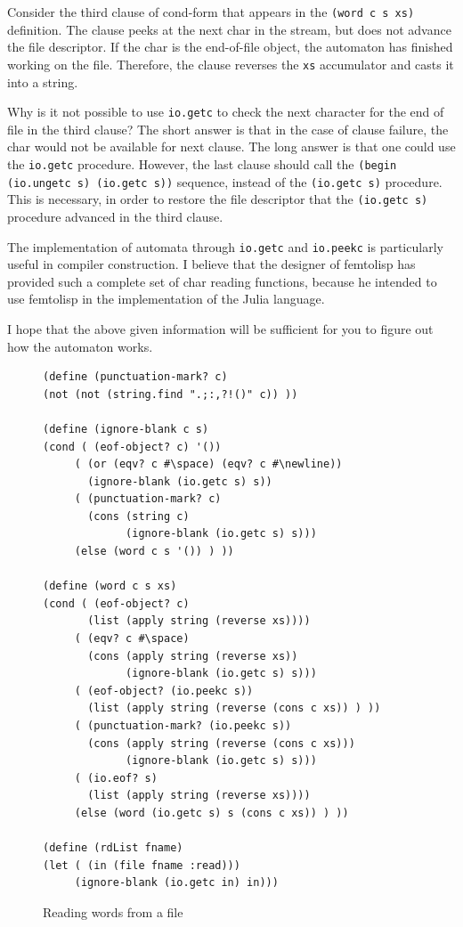 \documentclass[a4paper,12pt]{book}
\begin{document}
Consider the third clause of
cond-form that appears in
the \verb|(word c s xs)| definition.
The clause peeks at the next
char in the stream, but does not 
advance the file descriptor. If the
char is the end-of-file object,
the automaton has finished working on the
file. Therefore, the clause reverses
the \verb|xs| accumulator and 
casts it into a string.

Why is it not possible to use \verb|io.getc|
to check the next character for
the end of file in the third clause? 
The short answer
is that in the case of clause 
failure, the char would not be 
available for next clause.
The long answer is that one
could use the \verb|io.getc|
procedure. However, 
the last clause should 
call the \verb|(begin (io.ungetc s) (io.getc s))|
sequence,
instead of the \verb|(io.getc s)| procedure.
This is necessary, in order
to restore the file descriptor 
that the \verb|(io.getc s)|
procedure advanced in the third clause.

The implementation of automata through
\verb|io.getc| and \verb|io.peekc| is
particularly useful in compiler construction.
I believe that the designer of femtolisp
has provided such a complete set of
char reading functions, because he
intended to use femtolisp in the
implementation of the Julia language.

I hope that the above given
information will be sufficient for you to 
figure out how the automaton works.

\begin{figure}[!b]
\begin{verbatim}
(define (punctuation-mark? c)
(not (not (string.find ".;:,?!()" c)) ))

(define (ignore-blank c s)
(cond ( (eof-object? c) '())
     ( (or (eqv? c #\space) (eqv? c #\newline)) 
       (ignore-blank (io.getc s) s))
     ( (punctuation-mark? c)
       (cons (string c) 
             (ignore-blank (io.getc s) s)))
     (else (word c s '()) ) )) 

(define (word c s xs)
(cond ( (eof-object? c)
       (list (apply string (reverse xs))))
     ( (eqv? c #\space)
       (cons (apply string (reverse xs))
             (ignore-blank (io.getc s) s)))
     ( (eof-object? (io.peekc s))
       (list (apply string (reverse (cons c xs)) ) ))
     ( (punctuation-mark? (io.peekc s))
       (cons (apply string (reverse (cons c xs)))
             (ignore-blank (io.getc s) s)))
     ( (io.eof? s)
       (list (apply string (reverse xs))))
     (else (word (io.getc s) s (cons c xs)) ) ))

(define (rdList fname)
(let ( (in (file fname :read)))
     (ignore-blank (io.getc in) in)))
\end{verbatim}
\caption{Reading words from a file}
\label{wordsFromFile}
\end{figure}
\end{document}
